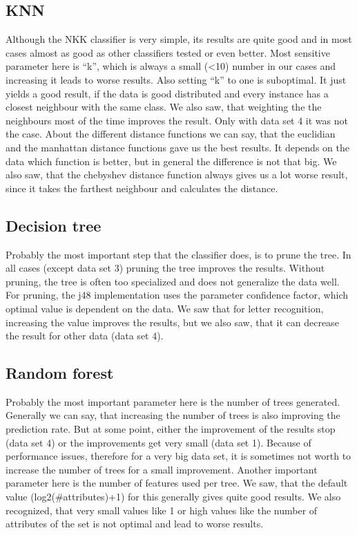 \documentclass{article}
\begin{document}
\subsection{KNN}

Although the NKK classifier is very simple, its results are quite good and in most cases almost as good as other classifiers tested or even better. Most sensitive parameter here is “k”, which is always a small (\textless10) number in our cases and increasing it leads to worse results. Also setting “k” to one is suboptimal. It just yields a good result, if the data is good distributed and every instance has a closest neighbour with the same class. We also saw, that weighting the the neighbours most of the time improves the result. Only with data set 4 it was not the case. About the different distance functions we can say, that the euclidian and the manhattan distance functions gave us the best results. It depends on the data which function is better, but in general the difference is not that big. We also saw, that the chebyshev distance function always gives us a lot worse result, since it takes the farthest neighbour and calculates the distance. 


\subsection{Decision tree}

Probably the most important step that the classifier does, is to prune the tree. In all cases (except data set 3) pruning the tree improves the results. Without pruning, the tree is often too specialized and does not generalize the data well. For pruning, the j48 implementation uses the parameter confidence factor, which optimal value is dependent on the data. We saw that for letter recognition, increasing the value improves the results, but we also saw, that it can decrease the result for other data (data set 4). 

\subsection{Random forest}

Probably the most important parameter here is the number of trees generated. Generally we can say, that increasing the number of trees is also improving the prediction rate. But at some point, either the improvement of the results stop (data set 4) or the improvements get very small (data set 1). Because of performance issues, therefore for a very big data set, it is sometimes not worth to increase the number of trees for a small improvement.
Another important parameter here is the number of features used per tree. We saw, that the default value (log2(\#attributes)+1) for this generally gives quite good results. We also recognized, that very small values like 1 or high values like the number of attributes of the set is not optimal and lead to worse results. 
\end{document}
